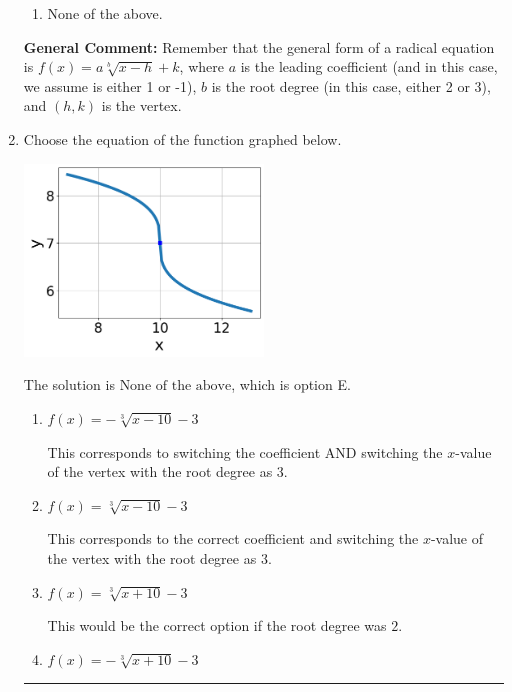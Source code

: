 \documentclass{extbook}[14pt]
\newcommand{\litem}[1]{\item #1

\rule{\textwidth}{0.4pt}}
\begin{document}
\begin{enumerate}
{\begin{enumerate}[label=\Alph*.]
\item None of the above.\end{enumerate}
\textbf{General Comment:} Remember that the general form of a radical equation is $ f(x) = a \sqrt[b]{x - h} + k $, where $a$ is the leading coefficient (and in this case, we assume is either 1 or -1), $b$ is the root degree (in this case, either 2 or 3), and $(h, k)$ is the vertex.
}
\litem{
Choose the equation of the function graphed below.

\begin{center}
    \includegraphics[width=0.5\textwidth]{../Figures/radicalGraphToEquationCopyC.png}
\end{center}


The solution is \( \text{None of the above} \), which is option E.\begin{enumerate}[label=\Alph*.]
\item \( f(x) = - \sqrt[3]{x - 10} - 3 \)

This corresponds to switching the coefficient AND switching the $x$-value of the vertex with the root degree as $3$.
\item \( f(x) = \sqrt[3]{x - 10} - 3 \)

This corresponds to the correct coefficient and switching the $x$-value of the vertex with the root degree as $3$.
\item \( f(x) = \sqrt[3]{x + 10} - 3 \)

This would be the correct option if the root degree was $2$.
\item \( f(x) = - \sqrt[3]{x + 10} - 3 \)


\end{enumerate}}
\end{enumerate}
\end{document}
